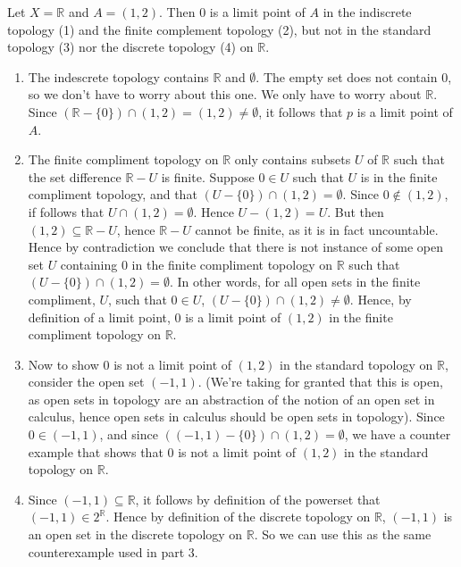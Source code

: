\documentclass{article}
\theoremstyle{definition}
\newcommand{\R}{\mathbb{R}}
\begin{document}
 Let $X = \R$ and $A = (1,2)$. Then $0$ is a limit point of $A$ in the indiscrete topology (1) and the finite complement topology (2), but not in the standard topology (3) nor the discrete topology (4) on $\R$.\\

\begin{enumerate}
    \item The indescrete topology contains $\R$ and $\emptyset$. The empty set does not contain $0$, so we don't have to worry about this one. We only have to worry about $\R$. Since $(\R-\{0\})\cap (1,2) = (1,2) \ne \emptyset$, it follows that $p$ is a limit point of $A$.
    \item The finite compliment topology on $\R$ only contains subsets $U$ of $\R$ such that the set difference $\R - U$ is finite. Suppose $0\in U$ such that $U$ is in the finite compliment topology, and that $(U-\{0\}) \cap (1,2) = \emptyset$. Since $0\not \in (1,2)$, if follows that $U \cap (1,2) = \emptyset$. Hence $U-(1,2) = U$. But then $(1,2) \subseteq \R - U $, hence $\R - U$ cannot be finite, as it is in fact uncountable. Hence by contradiction we conclude that there is not instance of some open set $U$ containing $0$ in the finite compliment topology on $\R$ such that $ (U-\{0\}) \cap (1,2) = \emptyset$. In other words, for all open sets in the finite compliment, $U$, such that $0\in U$, $(U-\{0\})\cap (1,2) \ne \emptyset$. Hence, by definition of a limit point, $0$ is a limit point of $(1,2)$ in the finite compliment topology on $\R$.
    \item Now to show $0$ is not a limit point of $(1,2)$ in the standard topology on $\R$, consider the open set $(-1,1)$. (We're taking for granted that this is open, as open sets in topology are an abstraction of the notion of an open set in calculus, hence open sets in calculus should be open sets in topology). Since $0\in (-1,1)$, and since $((-1,1)-\{0\})\cap (1,2) = \emptyset$, we have a counter example that shows that $0$ is not a limit point of $(1,2)$ in the standard topology on $\R$.
    \item Since $(-1,1)\subseteq \R$, it follows by definition of the powerset that $(-1,1)\in 2^\R$. Hence by definition of the discrete topology on $\R$, $(-1,1)$ is an open set in the discrete topology on $\R$. So we can use this as the same counterexample used in part 3.
\end{enumerate}
\end{document}
